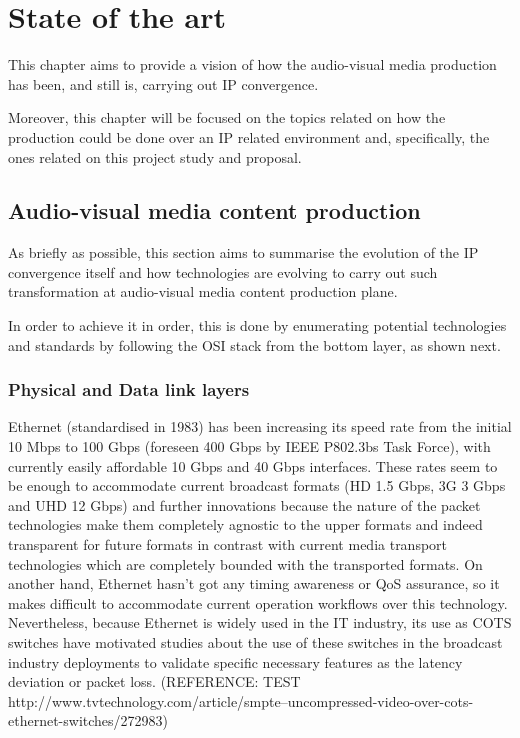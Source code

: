 \chapter{State of the art}\label{A:stateOfTheArt}

This chapter aims to provide a vision of how the audio-visual media production has been, and still is, carrying out IP convergence. 

Moreover, this chapter will be focused on the topics related on how the production could be done over an IP related environment and, specifically, the ones related on this project study and proposal.


\section{Audio-visual media content production}

As briefly as possible, this section aims to summarise the evolution of the IP convergence itself and how technologies are evolving to carry out such transformation at audio-visual media content production plane.

In order to achieve it in order, this is done by enumerating potential technologies and standards by following the OSI stack from the bottom layer, as shown next.

\subsection{Physical and Data link layers}

Ethernet (standardised in 1983) has been increasing its speed rate from the initial 10 Mbps to 100 Gbps (foreseen 400 Gbps by IEEE P802.3bs Task Force), with currently easily affordable 10 Gbps and 40 Gbps interfaces. These rates seem to be enough to accommodate current broadcast formats (HD 1.5 Gbps, 3G 3 Gbps and UHD 12 Gbps) and further innovations because the nature of the packet technologies make them completely agnostic to the upper formats and indeed transparent for future formats in contrast with current media transport technologies which are completely bounded with the transported formats. On another hand, Ethernet hasn't got any timing awareness or QoS assurance, so it makes difficult to accommodate current operation workflows over this technology. Nevertheless, because Ethernet is widely used in the IT industry, its use as COTS switches have motivated studies about the use of these switches in the broadcast industry deployments to validate specific necessary
features as the latency deviation or packet loss. (REFERENCE: TEST http://www.tvtechnology.com/article/smpte--uncompressed-video-over-cots-ethernet-switches/272983)

